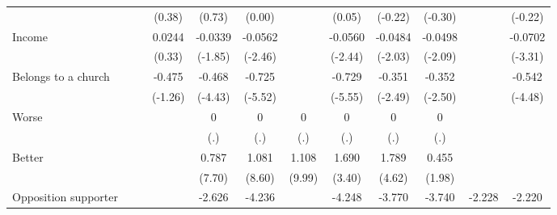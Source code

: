 {\begin{tabular}{l*{11}{c}}
                &                  &                  &   (0.38)         &   (0.73)         &   (0.00)         &                  &   (0.05)         &  (-0.22)         &  (-0.30)         &                  &  (-0.22)         \\
Income          &                  &                  &   0.0244         &  -0.0339         &  -0.0562\sym{*}  &                  &  -0.0560\sym{*}  &  -0.0484\sym{*}  &  -0.0498\sym{*}  &                  &  -0.0702\sym{***}\\
                &                  &                  &   (0.33)         &  (-1.85)         &  (-2.46)         &                  &  (-2.44)         &  (-2.03)         &  (-2.09)         &                  &  (-3.31)         \\
Belongs to a church&                  &                  &   -0.475         &   -0.468\sym{***}&   -0.725\sym{***}&                  &   -0.729\sym{***}&   -0.351\sym{*}  &   -0.352\sym{*}  &                  &   -0.542\sym{***}\\
                &                  &                  &  (-1.26)         &  (-4.43)         &  (-5.52)         &                  &  (-5.55)         &  (-2.49)         &  (-2.50)         &                  &  (-4.48)         \\
Worse           &                  &                  &                  &        0         &        0         &        0         &        0         &        0         &        0         &                  &                  \\
                &                  &                  &                  &      (.)         &      (.)         &      (.)         &      (.)         &      (.)         &      (.)         &                  &                  \\
Better          &                  &                  &                  &    0.787\sym{***}&    1.081\sym{***}&    1.108\sym{***}&    1.690\sym{***}&    1.789\sym{***}&    0.455\sym{*}  &                  &                  \\
                &                  &                  &                  &   (7.70)         &   (8.60)         &   (9.99)         &   (3.40)         &   (4.62)         &   (1.98)         &                  &                  \\
Opposition supporter&                  &                  &                  &   -2.626\sym{***}&   -4.236\sym{***}&                  &   -4.248\sym{***}&   -3.770\sym{***}&   -3.740\sym{***}&   -2.228\sym{***}&   -2.220\sym{***}\\

\end{tabular}}

